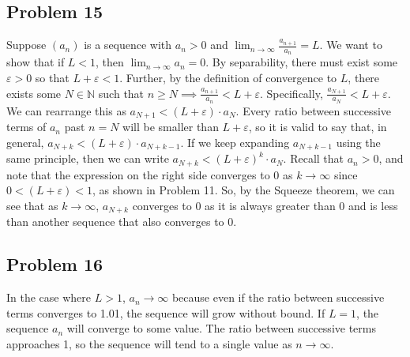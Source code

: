 \documentclass[11pt]{article}
\newcommand{\N}{\mathbb{N}}
\begin{document}
\subsection*{Problem 15}

Suppose $(a_n)$ is a sequence with $a_n > 0$ and 
$\lim_{n\to\infty} \frac{a_{n+1}}{a_n} = L$.
We want to show that if $L < 1$, then $\lim_{n\to\infty}a_n=0$.
By separability, there must exist some $\varepsilon > 0$ so that
$L + \varepsilon < 1$. Further, by the definition of convergence to $L$, 
there exists some $N \in \N$ such that 
$n \geq N \implies \frac{a_{n+1}}{a_n} < L + \varepsilon$.
Specifically, $\frac{a_{N+1}}{a_N}<L+\varepsilon$. We can rearrange this as
$a_{N+1} < (L+\varepsilon)\cdot a_N$. Every ratio between successive terms of $a_n$ past
$n=N$ will be smaller than $L+\varepsilon$, so it is valid to say that, in general,
$a_{N+k} < (L+\varepsilon)\cdot a_{N+k-1}$. If we keep expanding $a_{N+k-1}$ using
the same principle, then we can write $a_{N+k} < (L+\varepsilon)^k\cdot a_N$.
Recall that $a_n > 0$, and note that the expression on the right
side converges to 0 as $k\to\infty$ since $0<(L+\varepsilon)<1$, as shown in Problem 11. 
So, by the Squeeze theorem, we can see that as $k\to\infty$, $a_{N+k}$ converges to 0
as it is always greater than 0 and is less than another sequence that also 
converges to 0.


\subsection*{Problem 16}

In the case where $L > 1$, $a_n\to\infty$ because even if the ratio between
successive terms converges to 1.01, the sequence will grow without bound.
If $L = 1$, the sequence $a_n$ will converge to some value. The ratio between
successive terms approaches 1, so the sequence will tend to a single value as 
$n\to\infty$.
\end{document}
